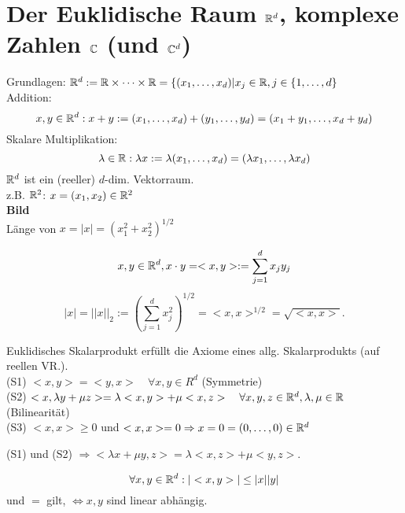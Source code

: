 \section{Der Euklidische Raum \( \mathbb{R}^d \), komplexe Zahlen \( \mathbb{C} \) (und \(\mathbb{C}^d \))}
Grundlagen: \( \mathbb{R}^d := \mathbb{R} \times \dots \times \mathbb{R} = \{ (x_1, \dots, x_d) | x_j \in\mathbb{R}, j\in\{1,\dots, d \} \)\\
Addition:
\[x, y \in \mathbb{R}^d: x + y := (x_1, \dots , x_d) + (y_1, \dots, y_d) = (x_1 + y_1, \dots, x_d + y_d) \]
Skalare Multiplikation:
\[\lambda \in \mathbb{R}: \lambda x := \lambda(x_1, \dots , x_d) = (\lambda x_1, \dots, \lambda x_d) \]
\( \mathbb{R}^d \) ist ein (reeller) \(d\)-dim. Vektorraum.\\
z.B. \(\mathbb{R}^2\): \(x = (x_1, x_2) \in \mathbb{R}^2\)\\
\textbf{Bild}\\%
Länge von \(x = |x| = (x_1^2 + x_2^2)^{1/2}\)
\begin{defi}
	\[ x,y \in\mathbb{R}^d, x\cdot y = <x,y> := \sum_{j=1}^{d}x_j y_j \]
	\[ |x| = ||x||_2 := (\sum_{j=1}^{d} x_j^2 )^{1/2} = <x,x>^{1/2} = \sqrt{<x,x>}. \]
\end{defi}
\begin{bem}
	Euklidisches Skalarprodukt erfüllt die Axiome eines allg. Skalarprodukts (auf reellen VR.).\\
	(S1) \( <x,y> = <y,x> \quad\forall x,y\in R^d \) (Symmetrie)\\
	(S2) \( <x, \lambda y + \mu z> = \lambda <x,y> + \mu<x,z> \quad \forall x,y,z\in\mathbb{R}^d, \lambda, \mu \in\mathbb{R} \) (Bilinearität)\\
	(S3) \( <x,x> \geq 0 \) und \( <x,x> = 0 \Rightarrow x=0 = (0,\dots,0) \in\mathbb{R}^d \)
\end{bem}
\begin{bem}
	(S1) und (S2) \( \Rightarrow <\lambda x + \mu y, z> = \lambda <x,z> + \mu <y,z> \).
\end{bem}
\begin{satz}
	\[ \forall x,y\in\mathbb{R}^d: |<x,y>|\leq |x||y|\]
	und \glqq\(=\)\grqq{} gilt, \( \Leftrightarrow x,y \) sind linear abhängig.
\end{satz}

